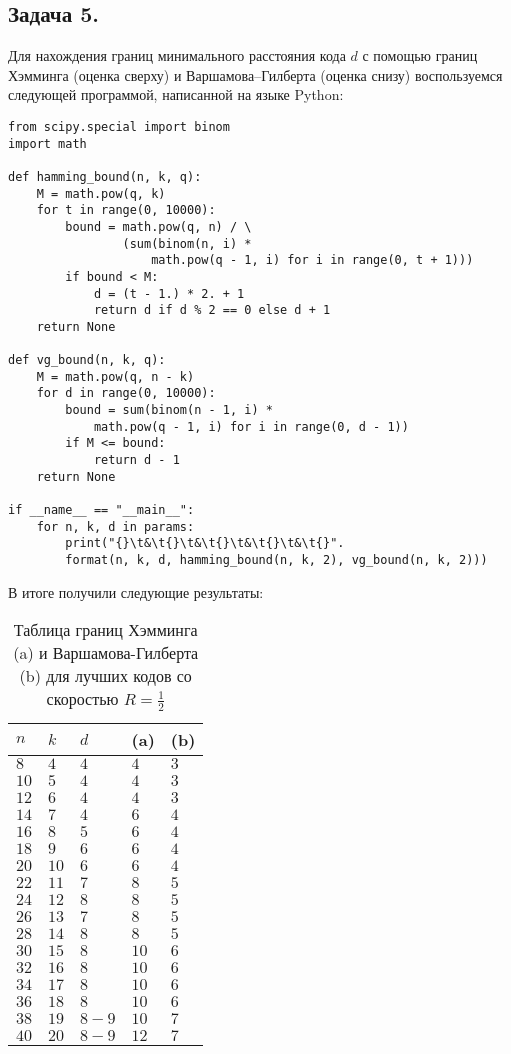 \documentclass{article}
\begin{document}
\subsection{Задача 5.}
Для нахождения границ минимального расстояния кода $d$ с помощью границ Хэмминга (оценка сверху) и Варшамова–Гилберта (оценка снизу) воспользуемся следующей программой, написанной на языке Python:
%
\begin{lstlisting}[frame=single]
from scipy.special import binom
import math

def hamming_bound(n, k, q):
    M = math.pow(q, k)
    for t in range(0, 10000):
        bound = math.pow(q, n) / \
                (sum(binom(n, i) * 
                    math.pow(q - 1, i) for i in range(0, t + 1)))
        if bound < M:
            d = (t - 1.) * 2. + 1
            return d if d % 2 == 0 else d + 1
    return None

def vg_bound(n, k, q):
    M = math.pow(q, n - k)
    for d in range(0, 10000):
        bound = sum(binom(n - 1, i) * 
            math.pow(q - 1, i) for i in range(0, d - 1))
        if M <= bound:
            return d - 1
    return None

if __name__ == "__main__":
    for n, k, d in params:
        print("{}\t&\t{}\t&\t{}\t&\t{}\t&\t{}".
        format(n, k, d, hamming_bound(n, k, 2), vg_bound(n, k, 2)))
\end{lstlisting}
%
В итоге получили следующие результаты:
%
\begin{table}[H]
\centering
\caption{Таблица границ Хэмминга (a) и Варшамова-Гилберта (b) для лучших кодов со скоростью $R=\frac{1}{2}$}
\begin{tabular}{|l|l|l|l|l|}
\hline
$n$     &   $k$     &   $d$     &   (a)     &   (b) \\ \hline
$8$	    &	$4$	    &	$4$	    &	$4$	    &	$3$ \\
$10$	&	$5$	    &	$4$ 	&	$4$	    &	$3$ \\
$12$	&	$6$	    &	$4$ 	&	$4$	    &	$3$ \\
$14$	&	$7$	    &	$4$ 	&	$6$	    &	$4$ \\
$16$	&	$8$	    &	$5$ 	&	$6$	    &	$4$ \\
$18$	&	$9$	    &	$6$	    &	$6$	    &	$4$ \\
$20$	&	$10$	&	$6$	    &	$6$ 	&	$4$ \\
$22$	&	$11$	&	$7$	    &	$8$ 	&	$5$ \\
$24$	&	$12$	&	$8$ 	&	$8$ 	&	$5$ \\
$26$	&	$13$	&	$7$ 	&	$8$	    &	$5$ \\
$28$	&	$14$	&	$8$ 	&	$8$ 	&	$5$ \\
$30$	&	$15$	&	$8$ 	&	$10$	&	$6$ \\
$32$	&	$16$	&	$8$ 	&	$10$	&	$6$ \\
$34$	&	$17$	&	$8$	    &	$10$	&	$6$ \\
$36$	&	$18$	&	$8$	    &	$10$	&	$6$ \\
$38$	&	$19$	&	$8 - 9$	&	$10$	&	$7$ \\
$40$	&	$20$	&	$8 - 9$	&	$12$	&	$7$ \\
\hline
\end{tabular}
\end{table}
%
\end{document}
